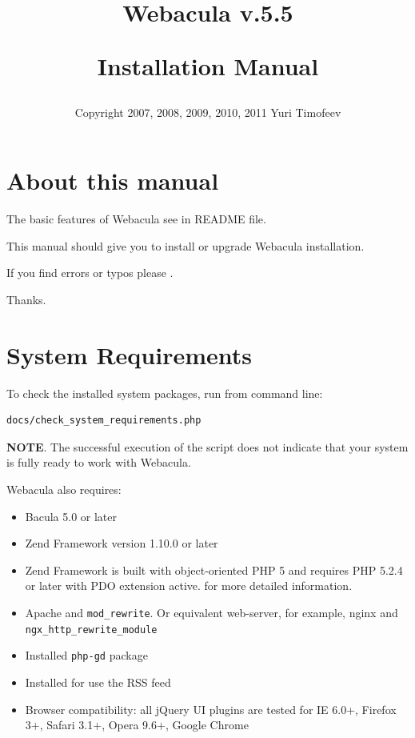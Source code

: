 \documentclass[10pt]{article}
\title{
  \Huge{Webacula v.5.5}
  \begin{center}
   \large{Installation Manual}
  \end{center}
}
\author{
  \begin{small}
    Copyright 2007, 2008, 2009, 2010, 2011 
    Yuri Timofeev \htmladdnormallink{tim4dev@gmail.com}{mailto:tim4dev@gmail.com}
  \end{small}
}
\begin{document}
\maketitle
\clearpage

\tableofcontents
\clearpage

\listoffigures
\clearpage

\section{About this manual}
\label{About}

The basic features of Webacula see in README file.

This manual should give you to install or upgrade Webacula installation.

If you find errors or typos please
.

Thanks.



\section{System Requirements}
\label{System Requirements}

To check the installed system packages, run from command line:
\begin{verbatim}docs/check_system_requirements.php\end{verbatim}

\textbf{NOTE}. The successful execution of the script does not indicate that your system is fully ready to work with Webacula.


Webacula also requires:
\begin{itemize}
  \item Bacula 5.0 or later
  \item Zend Framework version 1.10.0 or later
  \item Zend Framework is built with object-oriented PHP 5 and requires PHP 5.2.4 or later with PDO extension active.
        for more detailed information.
  \item Apache and \texttt{mod\_rewrite}. Or equivalent web-server, for example, nginx and \texttt{ngx\_http\_rewrite\_module}
  \item Installed \texttt{php-gd} package
  \item Installed  for use the RSS feed
  \item Browser compatibility: all jQuery UI plugins are tested for IE 6.0+, Firefox 3+, Safari 3.1+, Opera 9.6+, Google Chrome
\end{itemize}
\end{document}
